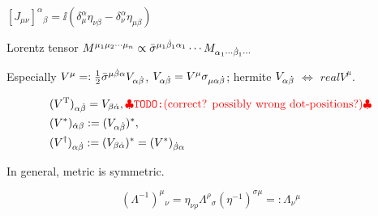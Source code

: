 \documentclass[CheatSheet]{subfiles}
\begin{document}
$[J_{\mu\nu}]^{\alpha}{}_{\beta}=
 \ii(\delta^\alpha_\mu\eta_{\nu\beta}-\delta^\alpha_\nu\eta_{\mu\beta})
$

\vspace{2em}

Lorentz tensor $
M^{\mu_1\mu_2\cdots\mu_n}\propto
\bar\sigma^{\mu_1{\dot\beta}_1\alpha_1}\cdots M_{\alpha_1\cdots{\dot\beta}_1\cdots}
$

Especially
$V^\mu =: \frac12 \bar\sigma^{\mu{\dot\beta}\alpha}V_{\alpha{\dot\beta}}$,
$V_{\alpha{\dot\beta}}=V^\mu\sigma_{\mu\alpha{\dot\beta}}$; hermite $V_{\alpha{\dot\beta}}$ $\Leftrightarrow$ $real V^\mu$.

\begin{align}
 &(V^{\mathrm{T}})_{\alpha{\dot\beta}} = V_{\beta{\dot\alpha}},\text{{\color{red}{$\clubsuit$\texttt{TODO:}(correct? possibly wrong dot-positions?)$\clubsuit$}}}\\
 &(V^*)_{{\dot\alpha}\beta}:= (V_{\alpha{\dot\beta}})^*,\\
 &(V^\dagger)_{\alpha{\dot\beta}} := (V_{\beta{\dot\alpha}})^* = (V^*)_{{\dot\beta}\alpha}
\end{align}


In general, metric is symmetric.

\begin{equation}
 (\Lambda^{-1})^\mu{}_\nu = \eta_{\nu\rho}\Lambda^{\rho}{}_\sigma(\eta^{-1})^{\sigma\mu}=:\Lambda_\nu{}^\mu
\end{equation}
\end{document}
